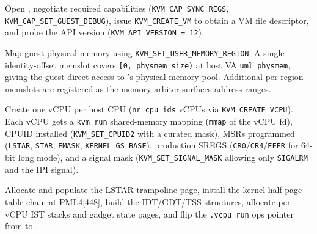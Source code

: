 \begin{description}[style=nextline,leftmargin=2em]
  \item[Phase A: VM creation.]
    Open , negotiate required capabilities
    (\texttt{KVM\_CAP\_SYNC\_REGS}, \texttt{KVM\_CAP\_SET\_GUEST\_DEBUG}),
    issue \texttt{KVM\_CREATE\_VM} to obtain a VM file descriptor, and probe
    the API version (\texttt{KVM\_API\_VERSION = 12}).

  \item[Phase B: Memory layout.]
    Map guest physical memory using \texttt{KVM\_SET\_USER\_MEMORY\_REGION}.
    A single identity-offset memslot covers \texttt{[0, physmem\_size)} at
    host VA \texttt{uml\_physmem}, giving the guest direct access to \UML{}'s
    physical memory pool.  Additional per-region memslots are registered as
    the \UML{} memory arbiter surfaces address ranges.

  \item[Phase C: vCPU pool.]
    Create one \KVM{} vCPU per host CPU (\texttt{nr\_cpu\_ids} vCPUs via
    \texttt{KVM\_CREATE\_VCPU}).  Each vCPU gets a \texttt{kvm\_run}
    shared-memory mapping (\texttt{mmap} of the vCPU fd), CPUID installed
    (\texttt{KVM\_SET\_CPUID2} with a curated mask), MSRs programmed
    (\texttt{LSTAR}, \texttt{STAR}, \texttt{FMASK},
    \texttt{KERNEL\_GS\_BASE}), production SREGS
    (\texttt{CR0}/\texttt{CR4}/\texttt{EFER} for 64-bit long mode), and a
    signal mask (\texttt{KVM\_SET\_SIGNAL\_MASK} allowing only
    \texttt{SIGALRM} and the IPI signal).

  \item[Phase D--E: Trap infrastructure.]
    Allocate and populate the LSTAR trampoline page, install the
    kernel-half page table chain at PML4[448], build the IDT/GDT/TSS
    structures, allocate per-vCPU IST stacks and gadget state pages, and
    flip the \texttt{.vcpu\_run} ops pointer from \Seccomp{} to \KVMvTwo{}.
\end{description}


